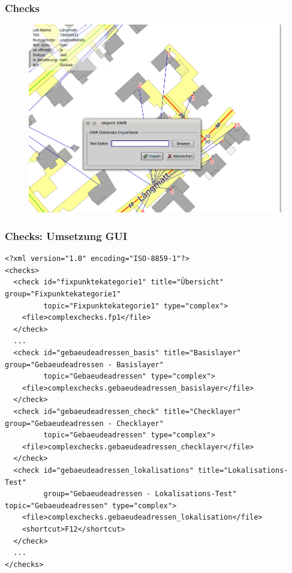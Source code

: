 \documentclass{beamer}
\begin{document}
\begin{frame}
  \frametitle{Checks}
  \begin{figure}
    \includegraphics[scale=0.3]{bilder/veriso_gwr_import.png}
  \end{figure}
\end{frame}

\begin{frame}[fragile]
  \frametitle{Checks: Umsetzung GUI}
  \begin{tiny}
  \begin{verbatim}
<?xml version="1.0" encoding="ISO-8859-1"?>
<checks>
  <check id="fixpunktekategorie1" title="Übersicht" group="Fixpunktekategorie1" 
         topic="Fixpunktekategorie1" type="complex">
    <file>complexchecks.fp1</file>
  </check>
  ...  
  <check id="gebaeudeadressen_basis" title="Basislayer" group="Gebaeudeadressen - Basislayer" 
         topic="Gebaeudeadressen" type="complex">
    <file>complexchecks.gebaeudeadressen_basislayer</file>
  </check>   
  <check id="gebaeudeadressen_check" title="Checklayer" group="Gebaeudeadressen - Checklayer" 
         topic="Gebaeudeadressen" type="complex">
    <file>complexchecks.gebaeudeadressen_checklayer</file>
  </check>    
  <check id="gebaeudeadressen_lokalisations" title="Lokalisations-Test" 
         group="Gebaeudeadressen - Lokalisations-Test" topic="Gebaeudeadressen" type="complex">
    <file>complexchecks.gebaeudeadressen_lokalisation</file>
    <shortcut>F12</shortcut>
  </check>           
  ...
</checks>   
  \end{verbatim}
  \end{tiny}
\end{frame}
\end{document}
